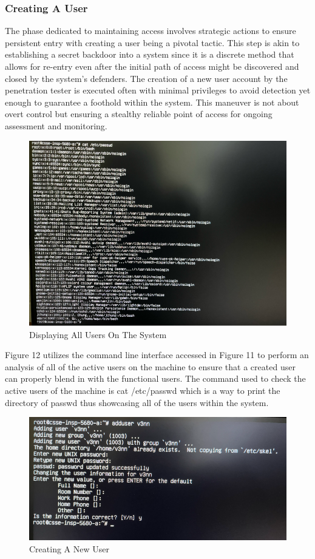 \documentclass[manuscript,acmsmall,anonymous,review,screen,nonacm=true, authorversion=true]{acmart}
\begin{document}
\subsubsection{Creating A User}
The phase dedicated to maintaining access involves strategic actions to ensure persistent
entry with creating a user being a pivotal tactic. This step is akin to establishing a
secret backdoor into a system since it is a discrete method that allows for re-entry even after the
initial path of access might be discovered and closed by the system's defenders.
The creation of a new user account by the penetration tester is executed often with minimal
privileges to avoid detection yet enough to guarantee a foothold within the system. This maneuver is not about overt control but ensuring a stealthy reliable point of access for
ongoing assessment and monitoring.
\begin{figure}
    \centering
    \includegraphics{pict/Picture12.png}
    \caption{Displaying All Users On The System}
    \label{fig:12}
\end{figure}
Figure 12 utilizes the command line interface accessed in Figure 11 to perform an
analysis of all of the active users on the machine to ensure that a created user can properly blend
in with the functional users. The command used to check the active users of the machine is
cat /etc/passwd which is a way to print the directory of passwd thus showcasing all of the users
within the system.
\begin{figure}
    \centering
    \includegraphics{pict/Picture13.png}
    \caption{Creating A New User}
    \label{fig:13}
\end{figure}
\end{document}

